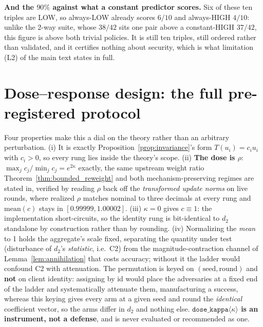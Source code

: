 \documentclass{article}
\begin{document}
\noindent \textbf{And the $90\%$ against what a constant predictor scores.} Six of these ten triples are
LOW, so always-LOW already scores $6/10$ and always-HIGH $4/10$: unlike the 2-way suite, whose $38/42$
sits one pair above a constant-HIGH $37/42$, this figure is above both trivial policies. It is still ten
triples, still ordered rather than validated, and it certifies nothing about security, which is what
limitation (L2) of the main text states in full.

\section{Dose--response design: the full pre-registered protocol}
\label{app:dose_protocol}
\label{app:details}

Four properties make this a dial on the theory rather than an arbitrary perturbation. (i) It is exactly Proposition~\ref{prop:invariance}'s form $T(u_i)=c_iu_i$ with $c_i>0$, so every rung lies inside the theory's scope. (ii) \textbf{The dose is $\rho$}: $\max_j c_j/\min_j c_j = e^{2\kappa}$ exactly, the same upstream weight ratio Theorem~\ref{thm:bounded_reweight} and both mechanism-preserving regimes are stated in, verified by reading $\rho$ back off the \emph{transformed update norms} on live rounds, where realized $\rho$ matches nominal to three decimals at every rung and $\mathrm{mean}(c)$ stays in $[0.99999, 1.00002]$. (iii) $\kappa{=}0$ gives $c \equiv 1$: the implementation short-circuits, so the identity rung is bit-identical to $d_2$ standalone by construction rather than by rounding. (iv) Normalizing the \emph{mean} to 1 holds the aggregate's scale fixed, separating the quantity under test (disturbance of $d_2$'s \emph{statistic}, i.e.\ C2) from the magnitude-contraction channel of Lemma~\ref{lem:annihilation} that costs accuracy; without it the ladder would confound C2 with attenuation. The permutation is keyed on $(\text{seed},\text{round})$ and \textbf{not} on client identity: assigning by id would place the adversaries at a fixed end of the ladder and systematically attenuate them, manufacturing a success, whereas this keying gives every arm at a given seed and round the \emph{identical} coefficient vector, so the arms differ in $d_2$ and nothing else. \textbf{$\texttt{dose\_kappa}\langle\kappa\rangle$ is an instrument, not a defense}, and is never evaluated or recommended as one.
\end{document}

